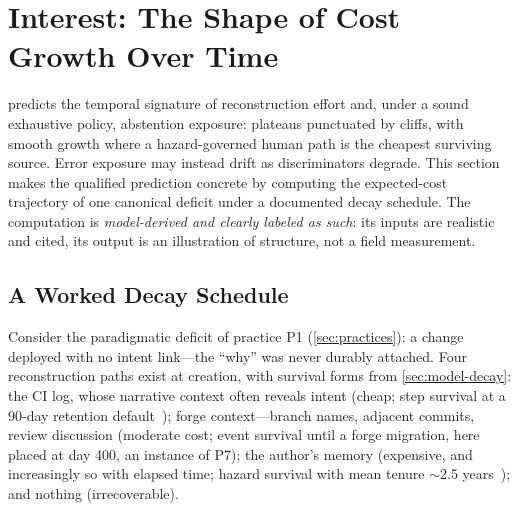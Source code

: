 \section{Interest: The Shape of Cost Growth Over Time}
\label{sec:interest}

 predicts the temporal signature of reconstruction effort and,
under a sound exhaustive policy, abstention exposure: plateaus punctuated by cliffs, with smooth
growth where a hazard-governed human path is the cheapest surviving source. Error
exposure may instead drift as discriminators degrade. This section makes the
qualified prediction concrete by computing
the expected-cost trajectory of one canonical deficit under a documented decay
schedule. The computation is \emph{model-derived and clearly labeled as such}: its
inputs are realistic and cited, its output is an illustration of structure, not a
field measurement.

\subsection{A Worked Decay Schedule}
\label{sec:interest-worked}

Consider the paradigmatic deficit of practice P1 (\cref{sec:practices}): a change
deployed with no intent link---the ``why'' was never durably attached. Four
reconstruction paths exist at creation, with survival forms from
\cref{sec:model-decay}: the CI log, whose narrative context often reveals intent
(cheap; step survival at a 90-day retention default~\cite{nist80092,ghdocs}); forge
context---branch names, adjacent commits, review discussion (moderate cost; event
survival until a forge migration, here placed at day 400, an instance of P7); the
author's memory (expensive, and increasingly so with elapsed time; hazard survival
with mean tenure $\sim$2.5 years~\cite{rigby2016}); and nothing (irrecoverable).

